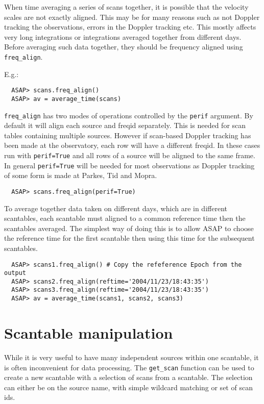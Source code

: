 \documentclass[11pt]{article}
\newcommand{\cmd}[1]{{\tt #1}}
\begin{document}
When time averaging a series of scans together, it is possible that
the velocity scales are not exactly aligned.  This may be for many
reasons such as not Doppler tracking the observations, errors in the
Doppler tracking etc.  This mostly affects very long integrations or
integrations averaged together from different days.  Before averaging
such data together, they should be frequency aligned using
\cmd{freq\_align}.

E.g.:

\begin{verbatim}
  ASAP> scans.freq_align()
  ASAP> av = average_time(scans)
\end{verbatim}

\cmd{freq\_align} has two modes of operations controlled by the
\cmd{perif} argument. By default it will align each source and freqid
separately. This is needed for scan tables containing multiple
sources. However if scan-based Doppler tracking has been made at the
observatory, each row will have a different freqid. In these cases run
with \cmd{perif=True} and all rows of a source will be aligned to the
same frame. In general \cmd{perif=True} will be needed for most
observations as Doppler tracking of some form is made at Parkes, Tid
and Mopra.

\begin{verbatim}
  ASAP> scans.freq_align(perif=True)
\end{verbatim}

To average together data taken on different days, which are in
different scantables, each scantable must aligned to a common
reference time then the scantables averaged. The simplest way of
doing this is to allow ASAP to choose the reference time for the first
scantable then using this time for the subsequent scantables.

\begin{verbatim}
  ASAP> scans1.freq_align() # Copy the refeference Epoch from the output
  ASAP> scans2.freq_align(reftime='2004/11/23/18:43:35')
  ASAP> scans3.freq_align(reftime='2004/11/23/18:43:35')
  ASAP> av = average_time(scans1, scans2, scans3)
\end{verbatim}

\section{Scantable manipulation}

While it is very useful to have many independent sources within one
scantable, it is often inconvenient for data processing. The
\cmd{get\_scan} function can be used to create a new scantable with a
selection of scans from a scantable. The selection can either be on
the source name, with simple wildcard matching or set of scan ids.
\end{document}
